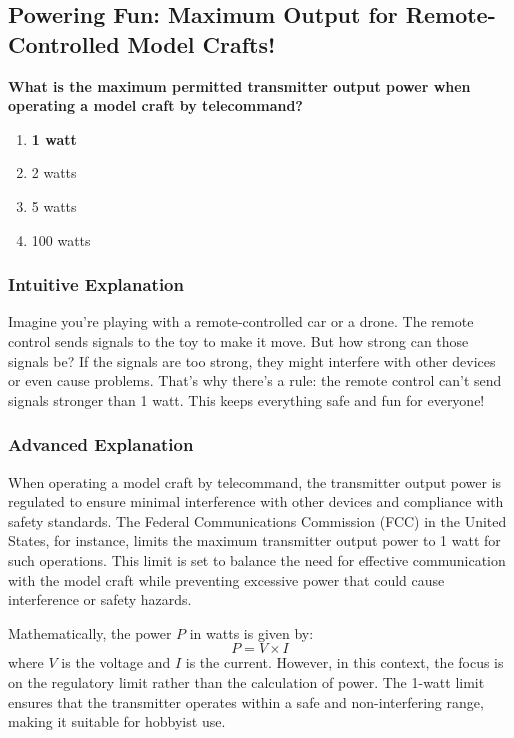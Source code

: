 \subsection{Powering Fun: Maximum Output for Remote-Controlled Model Crafts!}

\begin{tcolorbox}[colback=gray!10!white,colframe=black!75!black,title=\textbf{E1D06}]
\textbf{What is the maximum permitted transmitter output power when operating a model craft by telecommand?}
\begin{enumerate}[label=\Alph*.]
    \item \textbf{1 watt}
    \item 2 watts
    \item 5 watts
    \item 100 watts
\end{enumerate}
\end{tcolorbox}

\subsubsection*{Intuitive Explanation}
Imagine you’re playing with a remote-controlled car or a drone. The remote control sends signals to the toy to make it move. But how strong can those signals be? If the signals are too strong, they might interfere with other devices or even cause problems. That’s why there’s a rule: the remote control can’t send signals stronger than 1 watt. This keeps everything safe and fun for everyone!

\subsubsection*{Advanced Explanation}
When operating a model craft by telecommand, the transmitter output power is regulated to ensure minimal interference with other devices and compliance with safety standards. The Federal Communications Commission (FCC) in the United States, for instance, limits the maximum transmitter output power to 1 watt for such operations. This limit is set to balance the need for effective communication with the model craft while preventing excessive power that could cause interference or safety hazards.

Mathematically, the power \( P \) in watts is given by:
\[
P = V \times I
\]
where \( V \) is the voltage and \( I \) is the current. However, in this context, the focus is on the regulatory limit rather than the calculation of power. The 1-watt limit ensures that the transmitter operates within a safe and non-interfering range, making it suitable for hobbyist use.

